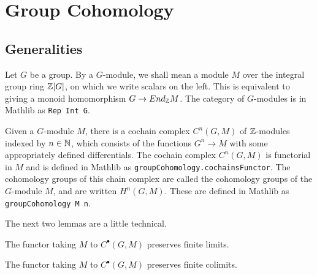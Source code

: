 %


\chapter{Group Cohomology}

\section{Generalities}

Let $G$ be a group.
By a $G$-module, we shall mean a module $M$ over the integral group ring ${\mathbb Z}[G]$, on which we
write scalars on the left. This is equivalent to giving a monoid homomorphism $G \to End_{\mathbb Z} M$.
The category of $G$-modules is in Mathlib as \texttt{Rep Int G}.

Given a $G$-module $M$, there is a cochain complex $C^n(G,M)$ of ${\mathbb Z}$-modules
indexed by $n \in {\mathbb N}$, which consists of the functions $G^n \to M$ with some appropriately defined
differentials.
The cochain complex $C^n(G,M)$ is functorial in $M$ and is defined in Mathlib as
\texttt{groupCohomology.cochainsFunctor}.
The cohomology groups of this chain complex are called the cohomology groups of the
$G$-module $M$, and are written $H^n(G,M)$. These are defined in Mathlib as
\texttt{groupCohomology M n}.

The next two lemmas are a little technical.

\begin{lemma}
  \label{lem:groupCohomology.exact1}
  The functor taking $M$ to $C^\bullet (G,M)$ preserves finite limits.
\end{lemma}

\begin{lemma}
  \label{lem:groupCohomology.exact2}
  The functor taking $M$ to $C^\bullet (G,M)$ preserves finite colimits.
\end{lemma}

